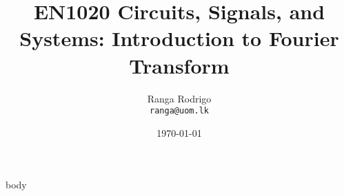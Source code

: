 \documentclass[t, aspectratio=169,xcolor={svgnames}, 10pt, handout]{beamer}
\title{EN1020 Circuits, Signals, and Systems: Introduction to Fourier Transform}
\author[]{Ranga Rodrigo\\ \texttt{ranga@uom.lk}}
\institute[]{The University of Moratuwa, Sri Lanka}
\date{\today}
\begin{document}
    \begin{frame}
        \titlepage
    \end{frame}







    {body}











\end{document}
